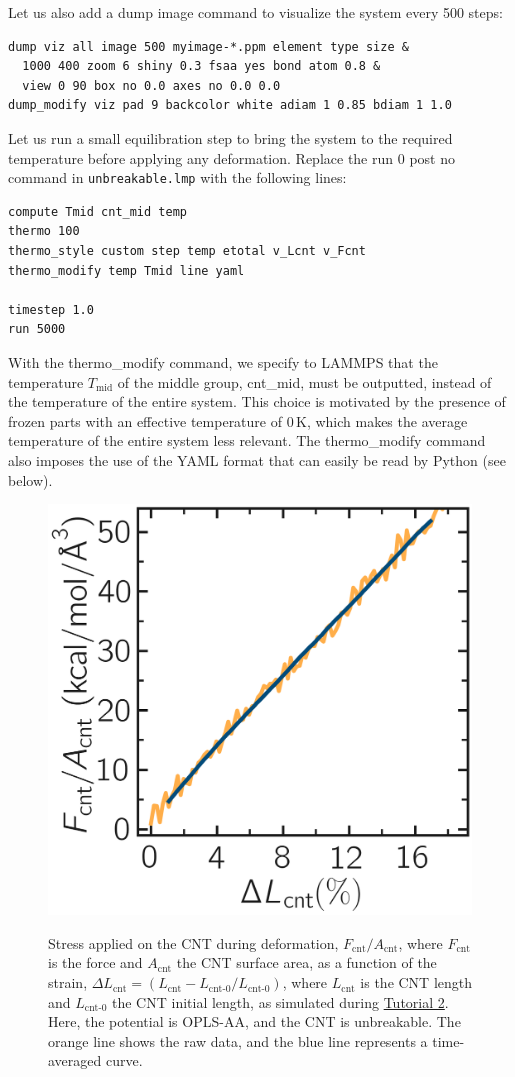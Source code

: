 \documentclass[9pt,tutorial]{livecoms}
\newcommand{\lmpcmd}[1]{\colorbox{listing}{\textcolor{command}{\small{#1}}}} %
\newcommand{\flecmd}[1]{\textcolor{command}{\texttt{#1}}} %
\begin{document}
Let us also add a \lmpcmd{dump image} command to visualize the system
every 500 steps:
\begin{lstlisting}
dump viz all image 500 myimage-*.ppm element type size &
  1000 400 zoom 6 shiny 0.3 fsaa yes bond atom 0.8 &
  view 0 90 box no 0.0 axes no 0.0 0.0
dump_modify viz pad 9 backcolor white adiam 1 0.85 bdiam 1 1.0
\end{lstlisting}
Let us run a small equilibration step to bring the system to the required
temperature before applying any deformation.  Replace the \lmpcmd{run 0 post no}
command in \flecmd{unbreakable.lmp} with the following lines:
\begin{lstlisting}
compute Tmid cnt_mid temp
thermo 100
thermo_style custom step temp etotal v_Lcnt v_Fcnt
thermo_modify temp Tmid line yaml

timestep 1.0
run 5000
\end{lstlisting}
With the \lmpcmd{thermo\_modify} command, we specify to LAMMPS that the
temperature $T_\mathrm{mid}$ of the middle group, \lmpcmd{cnt\_mid},
must be outputted, instead of the temperature of the entire system.
This choice is motivated by the presence of
frozen parts with an effective temperature of 0\,K, which makes the average
temperature of the entire system less relevant.  The \lmpcmd{thermo\_modify}
command also imposes the use of the YAML format that can easily be read by
Python (see below).
\begin{figure}
\centering
\includegraphics[width=0.55\linewidth]{CNT-unbreakable-stress-strain}\\[-2ex]
\caption{Stress applied on the CNT during deformation, $F_\text{cnt}/A_\text{cnt}$,
where $F_\text{cnt}$ is the force and $A_\text{cnt}$ the CNT surface area,
as a function of the strain, $\Delta L_\text{cnt} = (L_\text{cnt}-L_\text{cnt-0}/L_\text{cnt-0})$, where
$L_\text{cnt}$ is the CNT length and $L_\text{cnt-0}$ the CNT initial length,
as simulated during \hyperref[carbon-nanotube-label]{Tutorial 2}.
Here, the potential is OPLS-AA, and the CNT is unbreakable.  The orange line
shows the raw data, and the blue line represents a time-averaged curve.
}
\label{fig:CNT-stress-strain-unbreakable}
\end{figure}
\end{document}
